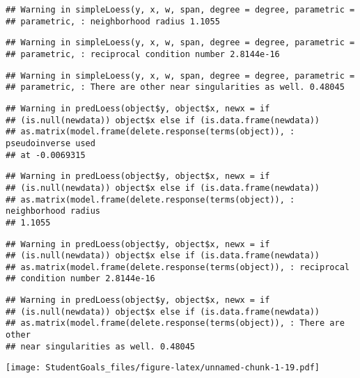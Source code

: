 \documentclass[]{article}
\begin{document}
\begin{verbatim}
## Warning in simpleLoess(y, x, w, span, degree = degree, parametric =
## parametric, : neighborhood radius 1.1055
\end{verbatim}

\begin{verbatim}
## Warning in simpleLoess(y, x, w, span, degree = degree, parametric =
## parametric, : reciprocal condition number 2.8144e-16
\end{verbatim}

\begin{verbatim}
## Warning in simpleLoess(y, x, w, span, degree = degree, parametric =
## parametric, : There are other near singularities as well. 0.48045
\end{verbatim}

\begin{verbatim}
## Warning in predLoess(object$y, object$x, newx = if
## (is.null(newdata)) object$x else if (is.data.frame(newdata))
## as.matrix(model.frame(delete.response(terms(object)), : pseudoinverse used
## at -0.0069315
\end{verbatim}

\begin{verbatim}
## Warning in predLoess(object$y, object$x, newx = if
## (is.null(newdata)) object$x else if (is.data.frame(newdata))
## as.matrix(model.frame(delete.response(terms(object)), : neighborhood radius
## 1.1055
\end{verbatim}

\begin{verbatim}
## Warning in predLoess(object$y, object$x, newx = if
## (is.null(newdata)) object$x else if (is.data.frame(newdata))
## as.matrix(model.frame(delete.response(terms(object)), : reciprocal
## condition number 2.8144e-16
\end{verbatim}

\begin{verbatim}
## Warning in predLoess(object$y, object$x, newx = if
## (is.null(newdata)) object$x else if (is.data.frame(newdata))
## as.matrix(model.frame(delete.response(terms(object)), : There are other
## near singularities as well. 0.48045
\end{verbatim}

\texttt{[image: StudentGoals\_files/figure-latex/unnamed-chunk-1-19.pdf]}
\end{document}
